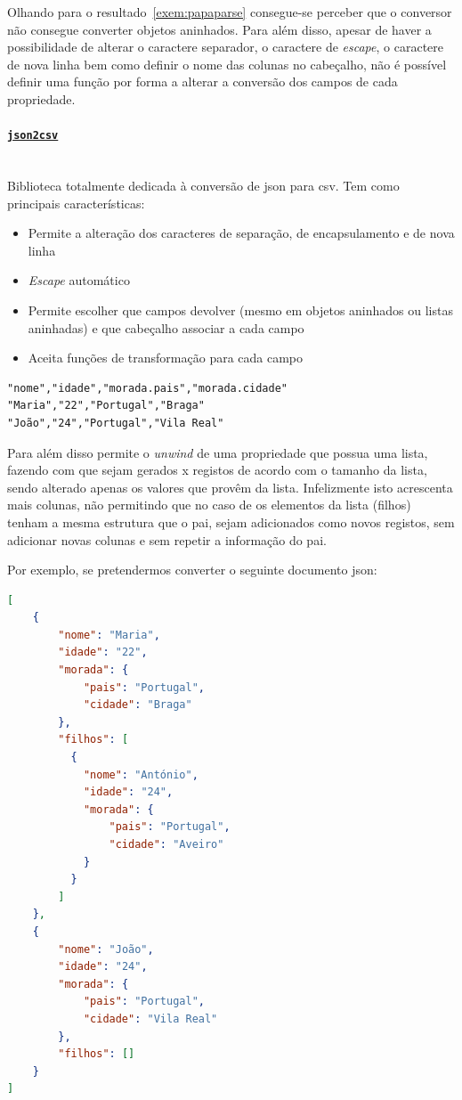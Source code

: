 Olhando para o resultado~\ref{exem:papaparse} consegue-se perceber que o conversor não consegue converter objetos aninhados. Para além disso, apesar de haver a possibilidade de alterar o caractere separador, o caractere de \textit{escape}, o caractere de nova linha bem como definir o nome das colunas no cabeçalho, não é possível definir uma função por forma a alterar a conversão dos campos de cada propriedade.

\paragraph{\href{https://www.npmjs.com/package/json2csv}{\texttt{json2csv}}} \mbox{} \\

Biblioteca totalmente dedicada à conversão de \acrshort{json} para \acrshort{csv}. Tem como principais características:
\begin{itemize}
    \item Permite a alteração dos caracteres de separação, de encapsulamento e de nova linha
    \item \textit{Escape} automático
    \item Permite escolher que campos devolver (mesmo em objetos aninhados ou listas aninhadas) e que cabeçalho associar a cada campo
    \item Aceita funções de transformação para cada campo
\end{itemize}

\begin{lstlisting}[caption=Resultado da conversão do exemplo~\ref{exem:jsonBib} usando o conversor \texttt{json2csv}, label=exem:json2csv]
"nome","idade","morada.pais","morada.cidade"
"Maria","22","Portugal","Braga"
"João","24","Portugal","Vila Real"
\end{lstlisting}

Para além disso permite o \textit{unwind} de uma propriedade que possua uma lista, fazendo com que sejam gerados x registos de acordo com o tamanho da lista, sendo alterado apenas os valores que provêm da lista. Infelizmente isto acrescenta mais colunas, não permitindo que no caso de os elementos da lista (filhos) tenham a mesma estrutura que o pai, sejam adicionados como novos registos, sem adicionar novas colunas e sem repetir a informação do pai. 

Por exemplo, se pretendermos converter o seguinte documento \acrshort{json}:
\begin{lstlisting}[language=json, caption=Outro exemplo em \acrshort{json} a converter, label=exem:jsonBib2]
[
    {
        "nome": "Maria",
        "idade": "22",
        "morada": {
            "pais": "Portugal",
            "cidade": "Braga"
        },
        "filhos": [
          {
            "nome": "António",
            "idade": "24",
            "morada": {
                "pais": "Portugal",
                "cidade": "Aveiro"
            }
          }
        ]
    },
    {
        "nome": "João",
        "idade": "24",
        "morada": {
            "pais": "Portugal",
            "cidade": "Vila Real"
        },
        "filhos": []
    }
]
\end{lstlisting}

